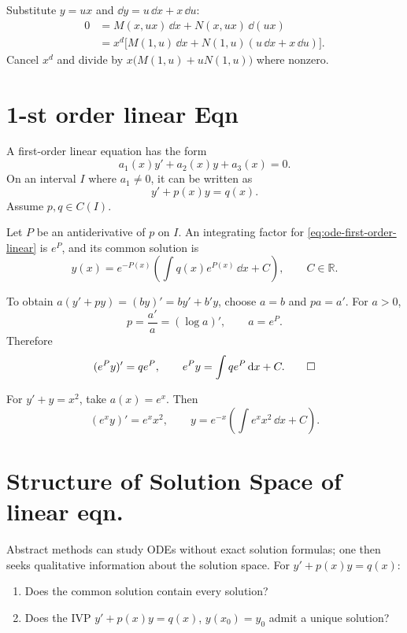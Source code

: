 \begin{proofenv}
Substitute $y=ux$ and $\dd y=u\,\dd x+x\,\dd u$:
\[
\begin{aligned}
    0&=M(x,ux)\,\dd x+N(x,ux)\,\dd(ux)\\
     &=x^d\bigl[M(1,u)\,\dd x
       +N(1,u)(u\,\dd x+x\,\dd u)\bigr].
\end{aligned}
\]
Cancel $x^d$ and divide by $x\bigl(M(1,u)+uN(1,u)\bigr)$ where nonzero.
\end{proofenv}

\section{1-st order linear Eqn}\label{sec:ode-linear}

A first-order linear equation has the form
\[
    a_1(x)y'+a_2(x)y+a_3(x)=0.
\]
On an interval $I$ where $a_1\ne0$, it can be written as
\begin{equation}\label{eq:ode-first-order-linear}
    y'+p(x)y=q(x).
\end{equation}
Assume $p,q\in C(I)$.

\begin{propositionenv}
Let $P$ be an antiderivative of $p$ on $I$. An integrating factor for
\eqref{eq:ode-first-order-linear} is $e^P$, and its common solution is
\[
    y(x)=e^{-P(x)}\left(\int q(x)e^{P(x)}\,\dd x+C\right),
    \qquad C\in\mathbb R.
\]
\end{propositionenv}

\begin{proofenv}
To obtain $a(y'+py)=(by)'=by'+b'y$, choose $a=b$ and $pa=a'$.
For $a>0$,
\[
    p=\frac{a'}a=(\log a)',\qquad a=e^P.
\]
Therefore
\[
    (e^Py)'=qe^P,
    \qquad e^Py=\int qe^P\,\mathrm{d} x+C.\qedhere
\]
\end{proofenv}

\begin{exampleenv}
For $y'+y=x^2$, take $a(x)=e^x$. Then
\[
    (e^xy)'=e^xx^2,
    \qquad y=e^{-x}\left(\int e^xx^2\,\dd x+C\right).
\]
\end{exampleenv}

\section{Structure of Solution Space of linear eqn.}

\begin{remark}
Abstract methods can study ODEs without exact solution formulas;
one then seeks qualitative information about the solution space.
For $y'+p(x)y=q(x)$:
\begin{enumerate}[label=(\arabic*)]
    \item Does the common solution contain every solution?
    \item Does the IVP $y'+p(x)y=q(x)$, $y(x_0)=y_0$ admit a unique solution?
\end{enumerate}
\end{remark}

